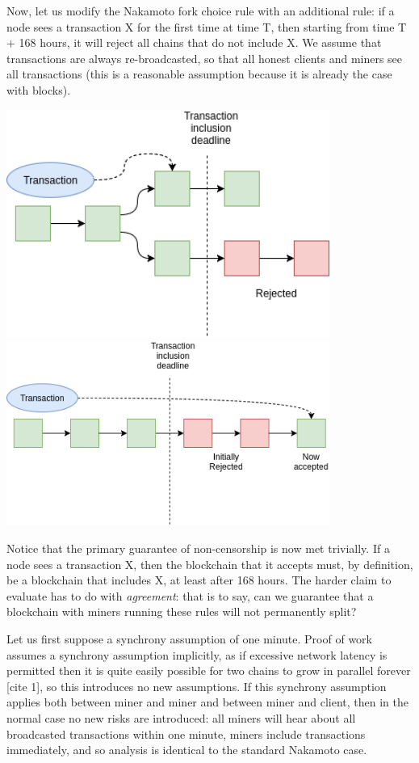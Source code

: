 \documentclass[12pt]{article}
\begin{document}
Now, let us modify the Nakamoto fork choice rule with an additional rule: if a node sees a transaction X for the first time at time T, then starting from time T + 168 hours, it will reject all chains that do not include X. We assume that transactions are always re-broadcasted, so that all honest clients and miners see all transactions (this is a reasonable assumption because it is already the case with blocks).

\includegraphics[width=400px]{Censorship3.png}
\includegraphics[width=400px]{Censorship3p5.png}

Notice that the primary guarantee of non-censorship is now met trivially. If a node sees a transaction X, then the blockchain that it accepts must, by definition, be a blockchain that includes X, at least after 168 hours. The harder claim to evaluate has to do with \textit{agreement}: that is to say, can we guarantee that a blockchain with miners running these rules will not permanently split?

Let us first suppose a synchrony assumption of one minute. Proof of work assumes a synchrony assumption implicitly, as if excessive network latency is permitted then it is quite easily possible for two chains to grow in parallel forever [cite 1], so this introduces no new assumptions. If this synchrony assumption applies both between miner and miner and between miner and client, then in the normal case no new risks are introduced: all miners will hear about all broadcasted transactions within one minute, miners include transactions immediately, and so analysis is identical to the standard Nakamoto case.
\end{document}
